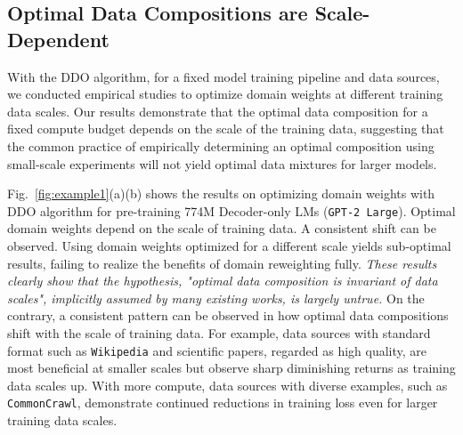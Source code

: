 \documentclass{article} %
\begin{document}





\subsection{Optimal Data Compositions are Scale-Dependent}
With the \textsc{DDO} algorithm, for a fixed model training pipeline and data sources, we conducted empirical studies to optimize domain weights at different training data scales. Our results demonstrate that the optimal data composition for a fixed compute budget depends on the scale of the training data, suggesting that the common practice of empirically determining an optimal composition using small-scale experiments will not yield optimal data mixtures for larger models. 

Fig.~\ref{fig:example1}(a)(b) shows the results on 
optimizing domain weights with \textsc{DDO} algorithm for pre-training 774M Decoder-only LMs (\texttt{GPT-2 Large}). Optimal domain weights depend on the scale of training data. A consistent shift can be observed. Using domain weights optimized for a different scale yields sub-optimal results, failing to realize the benefits of domain reweighting fully. \textit{These results clearly show that the hypothesis, "optimal data composition is invariant of data scales", implicitly assumed by many existing works, is largely untrue.}
On the contrary, a consistent pattern can be observed in how optimal data compositions shift with the scale of training data. 
For example, data sources with standard format such as \texttt{Wikipedia} and scientific papers, regarded as high quality, are most beneficial at smaller scales but observe sharp diminishing returns as training data scales up. With more compute, data sources with diverse examples, such as \texttt{CommonCrawl}, demonstrate continued reductions in training loss even for larger training data scales.
\end{document}
